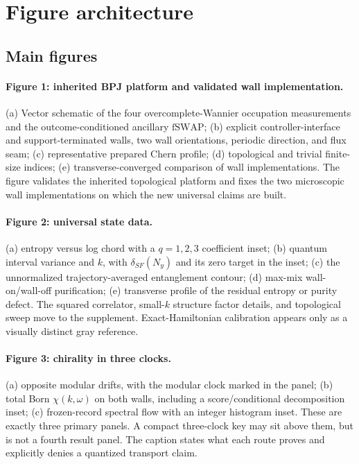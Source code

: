 \documentclass[aps,prx,twocolumn,floatfix,nofootinbib,superscriptaddress,longbibliography]{revtex4-2}
\newcommand{\mr}[1]{\mathrm{#1}}
\newcommand{\fSWAP}{\mr{fSWAP}}
\begin{document}
\section{Figure architecture}

\subsection{Main figures}
\paragraph*{Figure 1: inherited BPJ platform and validated wall implementation.}
(a) Vector schematic of the four overcomplete-Wannier occupation measurements and the
outcome-conditioned ancillary $\fSWAP$; (b) explicit controller-interface and
support-terminated walls, two wall
orientations, periodic direction, and flux seam; (c) representative prepared Chern profile;
(d) topological and trivial finite-size indices; (e) transverse-converged comparison of wall
implementations.  The figure validates the inherited topological platform and fixes the
two microscopic wall implementations on which the new universal claims are built.

\paragraph*{Figure 2: universal state data.}
(a) entropy versus log chord with a $q=1,2,3$ coefficient inset; (b) quantum interval
variance and $k$, with $\delta_{SF}(N_y)$ and its zero target in the inset; (c) the
unnormalized trajectory-averaged entanglement contour; (d)
max-mix wall-on/wall-off purification; (e) transverse profile of the residual entropy or
purity defect.  The squared correlator, small-$k$ structure factor details, and topological
sweep move to the supplement.  Exact-Hamiltonian calibration appears only as a visually
distinct gray reference.

\paragraph*{Figure 3: chirality in three clocks.}
(a) opposite modular drifts, with the modular clock marked in the panel; (b) total Born
$\chi(k,\omega)$ on both walls, including a score/conditional decomposition inset; (c)
frozen-record spectral flow with an integer histogram inset.  These are exactly three
primary panels.  A compact three-clock key may sit above them, but is not a fourth result
panel.  The caption states what each route proves and explicitly denies a quantized
transport claim.
\end{document}
